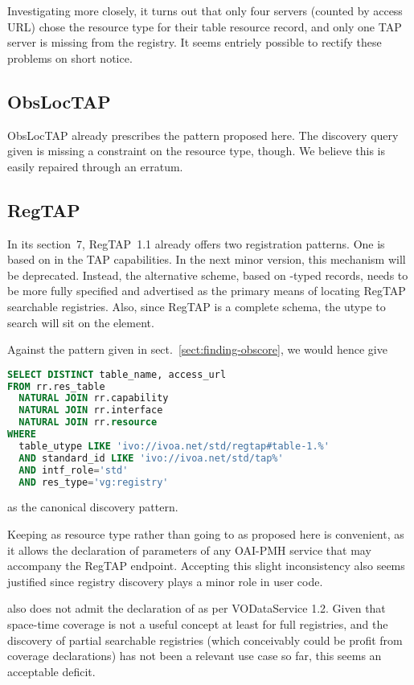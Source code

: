 \documentclass[11pt,a4paper]{ivoa}
\begin{document}
Investigating more closely, it turns out that only four servers (counted by
access URL) chose the  resource type for
their table resource record, and only one TAP server is missing from the
registry.  It seems entriely possible to rectify these problems on short
notice.

\subsection{ObsLocTAP}

ObsLocTAP \citep{2021ivoa.spec.0724S} already prescribes the pattern
proposed here. The discovery query given is missing a constraint on the
resource type, though.  We believe this is easily repaired through an
erratum.


\subsection{RegTAP}

In its section~7, RegTAP~1.1 \citep{2019ivoa.spec.1011D} already offers
two registration patterns.  One is based on  in the TAP
capabilities.  In the next minor version, this mechanism will be
deprecated.  Instead, the alternative scheme, based on
-typed records, needs to be more fully specified and
advertised as the primary means of locating RegTAP searchable
registries.   Also, since RegTAP is a complete schema, the utype to
search will sit on the  element.

Against the pattern given in sect.~\ref{sect:finding-obscore}, we would hence
give
\begin{lstlisting}[language=SQL]
SELECT DISTINCT table_name, access_url
FROM rr.res_table
  NATURAL JOIN rr.capability
  NATURAL JOIN rr.interface
  NATURAL JOIN rr.resource
WHERE
  table_utype LIKE 'ivo://ivoa.net/std/regtap#table-1.%'
  AND standard_id LIKE 'ivo://ivoa.net/std/tap%'
  AND intf_role='std'
  AND res_type='vg:registry'
\end{lstlisting}
as the canonical discovery pattern.

Keeping  as resource type rather than going to
 as proposed here is convenient, as it allows
the declaration of parameters of any OAI-PMH service that may accompany
the RegTAP endpoint.  Accepting this slight inconsistency also seems
justified since registry discovery plays a minor role in user code.

 also does not admit the declaration of
 as per VODataService 1.2.  Given that
space-time coverage is not a useful concept at least for full
registries, and the discovery of partial searchable registries (which
conceivably could be profit from coverage declarations)
has not been a relevant use case so
far, this seems an acceptable deficit.
\end{document}
